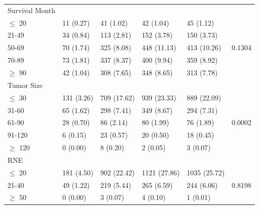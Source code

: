 \documentclass[times,sort&compress,3p]{elsarticle}
\theoremstyle{plain}
\theoremstyle{definition}
\begin{document}
\begin{table}[H]
\begin{tabular}{llllll}
                 Survival Month   &                                                              &              &              &              &                    \\
$\leq$ 20             & 11 (0.27)                                                    & 41 (1.02)    & 42 (1.04)    & 45 (1.12)    &                    \\
21-49            & 34 (0.84)                                                    & 113 (2.81)   & 152 (3.78)   & 150 (3.73)   &                    \\
50-69            & 70 (1.74)                                                    & 325 (8.08)   & 448 (11.13)  & 413 (10.26)  & 0.1304             \\
70-89            & 73 (1.81)                                                    & 337 (8.37)   & 400 (9.94)   & 359 (8.92)   &                    \\
$\geq$ 90             & 42 (1.04)                                                    & 308 (7.65)   & 348 (8.65)   & 313 (7.78)   &                    \\ \hline 
Tumor Size       &                                                              &              &              &              &                    \\
$\leq$ 30             & 131 (3.26)                                                   & 709 (17.62)  & 939 (23.33)  & 889 (22.09)  &                    \\
31-60            & 65 (1.62)                                                    & 298 (7.41)   & 349 (8.67)   & 294 (7.31)   &                    \\
61-90            & 28 (0.70)                                                    & 86 (2.14)    & 80 (1.99)    & 76 (1.89)    & 0.0002             \\
91-120           & 6 (0.15)                                                     & 23 (0.57)    & 20 (0.50)    & 18 (0.45)    &                    \\
$\geq$ 120            & 0 (0.00)                                                     & 8 (0.20)     & 2 (0.05)     & 3 (0.07)     &                    \\ \hline 
RNE              &                                                              &              &              &              &                    \\
$\leq$ 20             & 181 (4.50)                                                   & 902 (22.42)  & 1121 (27.86) & 1035 (25.72) &                    \\
21-40            & 49 (1.22)                                                    & 219 (5.44)   & 265 (6.59)   & 244 (6.06)   & 0.8198             \\
$\geq$ 50             & 0 (0.00)                                                     & 3 (0.07)     & 4 (0.10)     & 1 (0.01)     &                    \\ \hline 

\end{tabular}
\end{table}
\end{document}
